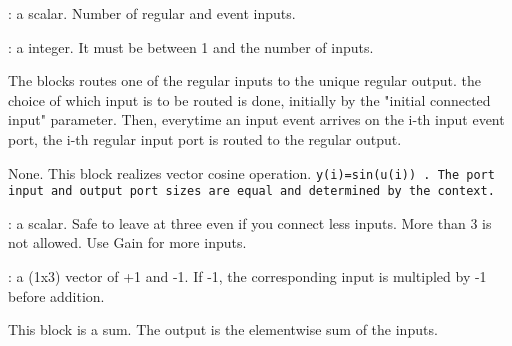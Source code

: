 \label{SELECTf}

\begin{scitem}
\item[{\verb?number of inputs?}]
: a scalar. Number of regular and event inputs.
\item[{\verb?initial connected input?}]
: a integer. It must be between 1 and the number of inputs.
\end{scitem}%
The blocks routes one of the regular inputs to the unique regular
output. the choice of which input is to be routed is done, initially
by the "initial connected input" parameter. Then, everytime an input
event arrives on the i-th input event port, the i-th regular input
port is routed to the regular output.









%
%


\label{SINBLKf}

None.
This block realizes vector cosine operation. %
\tt y(i)=sin(u(i))%
\rm .
The port input and output  port sizes are equal and determined by the
context.









%
%


\label{SOMf}

\begin{scitem}
\item[{\verb?Number of inputs?}]
: a scalar. Safe to leave at three even if you connect less inputs.
More than 3 is not allowed. Use Gain for more inputs.
\item[{\verb?Input signs?}]
: a (1x3) vector of +1 and -1. If -1, the corresponding input is
multipled by -1 before addition.
\end{scitem}%
This block is a sum. The output is the elementwise sum of the inputs.

